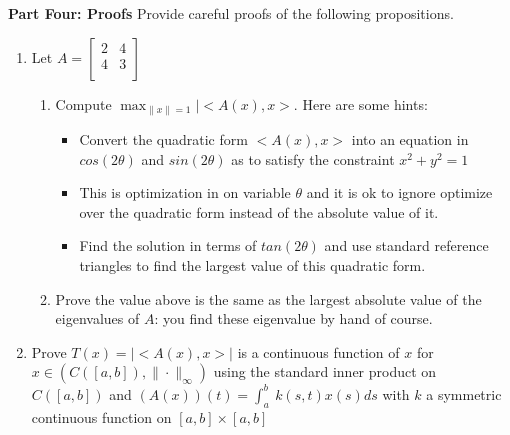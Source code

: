 \documentclass[11pt]{SelfArxOneColBMN}
\begin{document}
\textbf{Part Four: Proofs}
Provide careful proofs of the following propositions.
\begin{enumerate}
  \item Let $A =
  \begin{bmatrix}
    2 & 4\\
    4 & 3\\
  \end{bmatrix}
  $
  \begin{enumerate}[label=\alph*)]
    \item Compute $\max_{\|x\|=1}|<A(x),x>$. Here are some hints:
    \begin{itemize}
      \item Convert the quadratic form $<A(x),x>$ into an equation in $cos(2\theta)$ and $sin(2\theta)$ as to satisfy the constraint $x^2 + y^2 = 1$
      \item This is optimization in on variable $\theta$ and it is ok to ignore optimize over the quadratic form instead of the absolute value of it.
      \item Find the solution in terms of $tan(2\theta)$ and use standard reference triangles to find the largest value of this quadratic form.
    \end{itemize}
    \item Prove the value above is the same as the largest absolute value of the eigenvalues of $A$: you find these eigenvalue by hand of course.
  \end{enumerate}
  \item Prove $T(x) = |<A(x),x>|$ is a continuous function of $x$ for $x \in (C([a,b]),\|\cdot\|_\infty)$ using the standard inner product on $C([a,b])$ and $(A(x))(t) = \int_a^b\:k(s,t)x(s)ds$ with $k$ a symmetric continuous function on $[a,b]\times[a,b]$
\end{enumerate}
\end{document}

